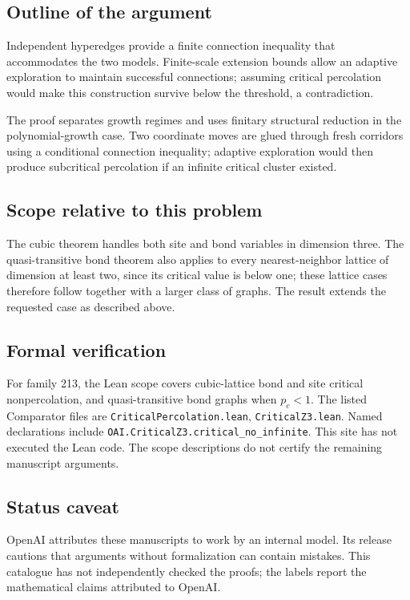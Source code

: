 \documentclass[11pt]{article}
\begin{document}
\subsection{Outline of the argument}
Independent hyperedges provide a finite connection inequality that accommodates the two models. Finite-scale extension bounds allow an adaptive exploration to maintain successful connections; assuming critical percolation would make this construction survive below the threshold, a contradiction.

The proof separates growth regimes and uses finitary structural reduction in the polynomial-growth case. Two coordinate moves are glued through fresh corridors using a conditional connection inequality; adaptive exploration would then produce subcritical percolation if an infinite critical cluster existed.

\subsection{Scope relative to this problem}
The cubic theorem handles both site and bond variables in dimension three. The quasi-transitive bond theorem also applies to every nearest-neighbor lattice of dimension at least two, since its critical value is below one; these lattice cases therefore follow together with a larger class of graphs. The result extends the requested case as described above.

\subsection{Formal verification}
For family 213, the Lean scope covers cubic-lattice bond and site critical nonpercolation, and quasi-transitive bond graphs when $p_c<1$. The listed Comparator files are \texttt{CriticalPercolation.lean}, \texttt{CriticalZ3.lean}. Named declarations include \texttt{OAI.CriticalZ3.critical\_no\_infinite}. This site has not executed the Lean code. The scope descriptions do not certify the remaining manuscript arguments.

\subsection{Status caveat}
OpenAI attributes these manuscripts to work by an internal model. Its release cautions that arguments without formalization can contain mistakes. This catalogue has not independently checked the proofs; the labels report the mathematical claims attributed to OpenAI.
\end{document}
